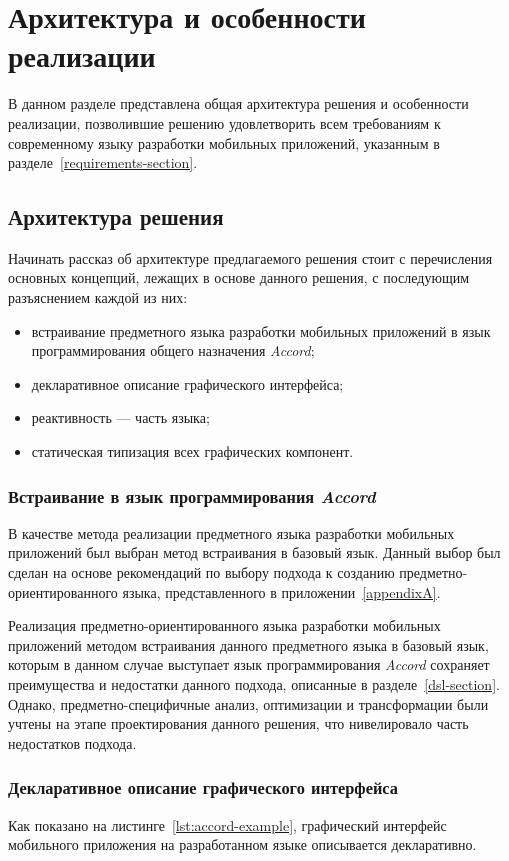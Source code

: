 \section{Архитектура и особенности реализации}
В данном разделе представлена общая архитектура решения и особенности реализации, позволившие решению удовлетворить всем требованиям к
современному языку разработки мобильных приложений, указанным в разделе~\ref{requirements-section}.

\subsection{Архитектура решения}
Начинать рассказ об архитектуре предлагаемого решения стоит с перечисления
основных концепций, лежащих в основе данного решения, с последующим
разъяснением каждой из них:
\begin{itemize}
	\item встраивание предметного языка разработки мобильных приложений
	в язык программирования общего назначения \textit{Accord};
	\item декларативное описание графического интерфейса;
	\item реактивность --- часть языка;
	\item статическая типизация всех графических компонент.
\end{itemize}

\subsubsection*{Встраивание в язык программирования \textit{Accord}}
В качестве метода реализации предметного языка разработки мобильных
приложений был выбран метод встраивания в базовый язык. Данный выбор был
сделан на основе рекомендаций по выбору подхода к созданию
предметно-ориентированного языка, представленного
в приложении~\ref{appendixA}.

Реализация предметно-ориентированного языка разработки мобильных приложений
методом встраивания данного предметного языка в базовый язык, которым в
данном случае выступает язык программирования \textit{Accord} сохраняет
преимущества и недостатки данного подхода, описанные в разделе~\ref{dsl-section}.
Однако, предметно-специфичные анализ, оптимизации и трансформации были
учтены на этапе проектирования данного решения, что нивелировало часть
недостатков подхода.


\subsubsection*{Декларативное описание графического интерфейса}
Как показано на листинге~\ref{lst:accord-example}, графический интерфейс
мобильного приложения на разработанном языке описывается декларативно.

